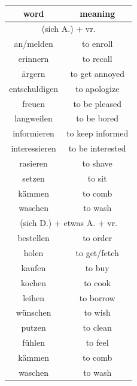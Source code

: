 \begin{center}
    \begin{tabular}{|c|c|}
        \hline
        \rowcolor{gray}
        word          & meaning                          \\
        \hline
        \multicolumn{2}{|c|}{(sich A.) + vr.}            \\
        an/melden     & to enroll                        \\
        erinnern      & to recall                        \\
        ärgern        & to get annoyed                   \\
        entschuldigen & to apologize                     \\
        freuen        & to be pleased                    \\
        langweilen    & to be bored                      \\
        informieren   & to keep informed                 \\
        interessieren & to be interested                 \\
        rasieren      & to shave                         \\
        setzen        & to sit                           \\
        kämmen        & to comb                          \\
        waschen       & to wash                          \\
        \hline
        \multicolumn{2}{|c|}{(sich D.) + etwas A. + vr.} \\
        bestellen     & to order                         \\
        holen         & to get/fetch                     \\
        kaufen        & to buy                           \\
        kochen        & to cook                          \\
        leihen        & to borrow                        \\
        wünschen      & to wish                          \\
        putzen        & to clean                         \\
        fühlen        & to feel                          \\
        kämmen        & to comb                          \\
        waschen       & to wash                          \\

\end{tabular}
\end{center}
